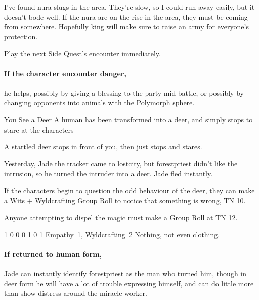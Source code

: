 \begin{multicols}{2}
\begin{speechtext}

	I've found nura slugs in the area.
	They're slow, so I could run away easily, but it doesn't bode well.
	If the nura are on the rise in the area, they must be coming from somewhere.
	Hopefully \gls{king} will make sure to raise an army for everyone's protection.

\end{speechtext}

Play the next Side Quest's encounter immediately.
\paragraph{If the character encounter danger,}
he helps, possibly by giving a blessing to the party mid-battle, or possibly by changing opponents into animals with the Polymorph sphere.

\forestpriest

{You See a Deer}%
{A human has been transformed into a deer, and simply stops to stare at the characters}%

\begin{boxtext}

	A startled deer stops in front of you, then just stops and stares.

\end{boxtext}

Yesterday, Jade the tracker came to \gls{lostcity}, but \gls{forestpriest} didn't like the intrusion, so he turned the intruder into a deer.
Jade fled instantly.

If the characters begin to question the odd behaviour of the deer, they can make a Wits + Wyldcrafting Group Roll to notice that something is wrong, TN 10.

Anyone attempting to dispel the magic must make a Group Roll at TN 12.

	{1}%
	{0}%
	{{0}%
	{0}%
	{1}}%
	{0}%
	{1}%
	{Empathy~1, Wyldcrafting~2}%
	{Nothing, not even clothing.}%
	{}

\paragraph{If returned to human form,}
Jade can instantly identify \gls{forestpriest} as the man who turned him, though in deer form he will have a lot of trouble expressing himself, and can do little more than show distress around the miracle worker.


\end{multicols}

